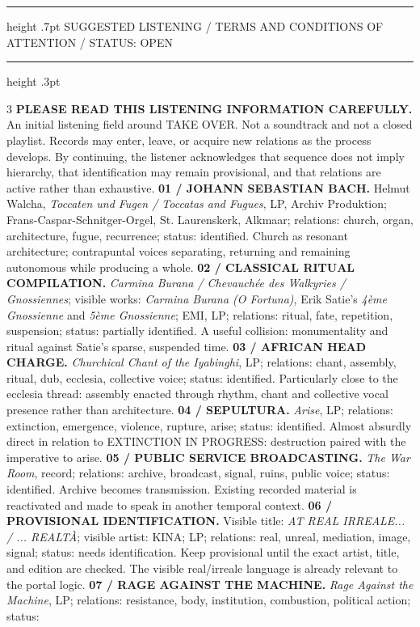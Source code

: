 \documentclass[10pt]{article}
\begin{document}
\thispagestyle{empty}
\vspace*{10mm}\hspace*{10mm}
\begin{minipage}{190mm}
  \hrule height .7pt
  \vspace{2.5mm}
  {\metafont\fontsize{7}{8}\selectfont SUGGESTED LISTENING / TERMS AND CONDITIONS OF ATTENTION / STATUS: OPEN}\par
  \vspace{1.5mm}
  \hrule height .3pt
  \vspace{3mm}
  {\fontsize{5.6}{6.35}\selectfont\justifying
  \setlength{\columnsep}{5mm}
  \setlength{\columnseprule}{.25pt}
  \begin{multicols}{3}
  \textbf{PLEASE READ THIS LISTENING INFORMATION CAREFULLY.} An initial listening field around TAKE OVER. Not a soundtrack and not a closed playlist. Records may enter, leave, or acquire new relations as the process develops. By continuing, the listener acknowledges that sequence does not imply hierarchy, that identification may remain provisional, and that relations are active rather than exhaustive. \textbf{01 / JOHANN SEBASTIAN BACH.} Helmut Walcha, \emph{Toccaten und Fugen / Toccatas and Fugues}, LP, Archiv Produktion; Frans-Caspar-Schnitger-Orgel, St. Laurenskerk, Alkmaar; relations: church, organ, architecture, fugue, recurrence; status: identified. Church as resonant architecture; contrapuntal voices separating, returning and remaining autonomous while producing a whole. \textbf{02 / CLASSICAL RITUAL COMPILATION.} \emph{Carmina Burana / Chevauch\'ee des Walkyries / Gnossiennes}; visible works: \emph{Carmina Burana (O Fortuna)}, Erik Satie's \emph{4\`eme Gnossienne} and \emph{5\`eme Gnossienne}; EMI, LP; relations: ritual, fate, repetition, suspension; status: partially identified. A useful collision: monumentality and ritual against Satie's sparse, suspended time. \textbf{03 / AFRICAN HEAD CHARGE.} \emph{Churchical Chant of the Iyabinghi}, LP; relations: chant, assembly, ritual, dub, ecclesia, collective voice; status: identified. Particularly close to the ecclesia thread: assembly enacted through rhythm, chant and collective vocal presence rather than architecture. \textbf{04 / SEPULTURA.} \emph{Arise}, LP; relations: extinction, emergence, violence, rupture, arise; status: identified. Almost absurdly direct in relation to EXTINCTION IN PROGRESS: destruction paired with the imperative to arise. \textbf{05 / PUBLIC SERVICE BROADCASTING.} \emph{The War Room}, record; relations: archive, broadcast, signal, ruins, public voice; status: identified. Archive becomes transmission. Existing recorded material is reactivated and made to speak in another temporal context. \textbf{06 / PROVISIONAL IDENTIFICATION.} Visible title: \emph{AT REAL IRREALE... / ... REALT\`A}; visible artist: KINA; LP; relations: real, unreal, mediation, image, signal; status: needs identification. Keep provisional until the exact artist, title, and edition are checked. The visible real/irreale language is already relevant to the portal logic. \textbf{07 / RAGE AGAINST THE MACHINE.} \emph{Rage Against the Machine}, LP; relations: resistance, body, institution, combustion, political action; status: 
\end{multicols}}
\end{minipage}
\end{document}
